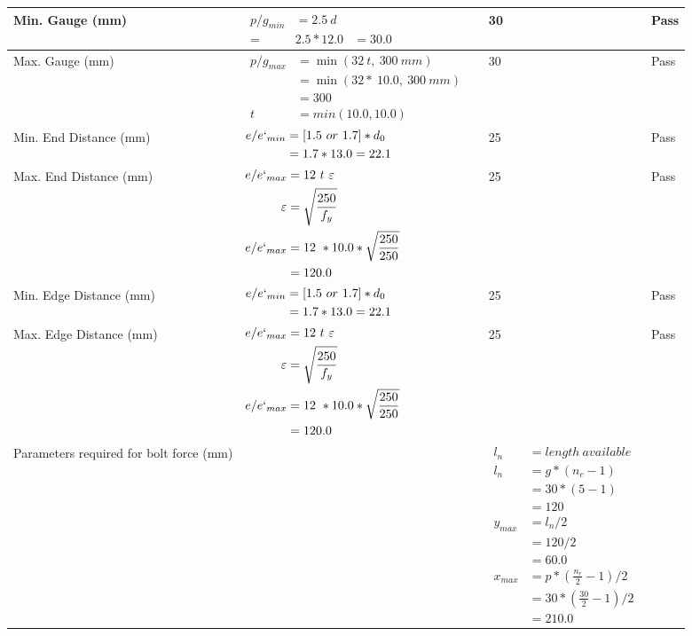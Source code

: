 \documentclass{article}%
\begin{document}
\begin{longtable}{|p{3cm}|p{5cm}|p{7.5cm}|p{1.5cm}|}
\hline%
Min. Gauge (mm)&$\begin{aligned}p/g_{min}&= 2.5 ~ d&\\ =&2.5*12.0&=30.0\end{aligned}$&30&Pass\\%
\hline%
Max. Gauge (mm)&$\begin{aligned}p/g_{max} &=\min(32~t,~300~mm)&\\ &=\min(32 *~10.0,~ 300 ~mm)\\&=300\\  t& = min(10.0,10.0)\end{aligned}$&30&Pass\\%
\hline%
Min. End Distance (mm)&$\begin{aligned}e/e`_{min} &=[1.5~or~ 1.7] * d_0\\ &=1.7*13.0=22.1 \end{aligned}$&25&Pass\\%
\hline%
Max. End Distance (mm)&$\begin{aligned}e/e`_{max} &= 12~ t~ \varepsilon&\\ \varepsilon &= \sqrt{\frac{250}{f_y}}\\ e/e`_{max}&=12 ~*10.0*\sqrt{\frac{250}{250}}\\ &=120.0\\ \end{aligned}$&25&Pass\\%
\hline%
Min. Edge Distance (mm)&$\begin{aligned}e/e`_{min} &=[1.5~or~ 1.7] * d_0\\ &=1.7*13.0=22.1 \end{aligned}$&25&Pass\\%
\hline%
Max. Edge Distance (mm)&$\begin{aligned}e/e`_{max} &= 12~ t~ \varepsilon&\\ \varepsilon &= \sqrt{\frac{250}{f_y}}\\ e/e`_{max}&=12 ~*10.0*\sqrt{\frac{250}{250}}\\ &=120.0\\ \end{aligned}$&25&Pass\\%
\hline%
Parameters required for bolt force (mm)&&$\begin{aligned} l_n~~~ &= length~available \\  l_n~~~ &= g * (n_c - 1)\\  &= 30 * (5 - 1)\\  & =120\\  y_{max} &= l_n / 2\\  &= 120 / 2 \\  & =60.0\\ x_{max} &= p * (\frac{n_r}{2} - 1) / 2 \\  &= 30 * (\frac{30}{2} - 1) / 2 \\  & =210.0\end{aligned}$&\\%

\end{longtable}
\end{document}
